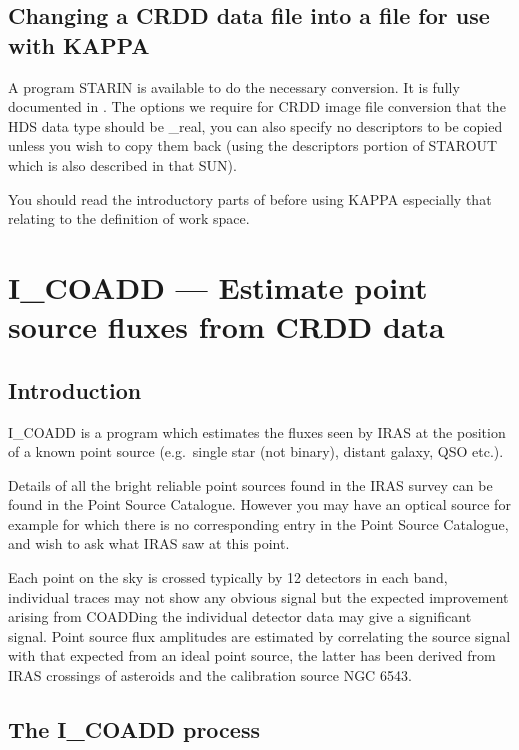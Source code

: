 \documentclass[nolof,noabs,11pt]{starlink}
\begin{document}
\subsection{Changing a CRDD data file into a file for use with KAPPA}

A program STARIN is available to do the necessary conversion. It is fully
documented in . The options we require for CRDD image file conversion
that the HDS data type should be \_real, you can also specify no descriptors to
be copied unless you wish to copy them back (using the descriptors portion of
STAROUT which is also described in that SUN).

You should read the introductory parts of  before using KAPPA especially
that relating to the definition of work space.

\pagebreak

\section{I\_COADD --- Estimate point source fluxes from CRDD data}

\subsection{Introduction}

I\_COADD is a program which estimates the fluxes seen by IRAS at the position
of a known point source (e.g.\ single star (not binary), distant galaxy, QSO
etc.).

Details of all the bright reliable point sources found in the IRAS survey can
be found in the Point Source Catalogue. However you may have an optical source
for example for which there is no corresponding entry in the Point Source
Catalogue, and wish to ask what IRAS saw at this point.


Each point on the sky is crossed typically by 12 detectors in each band,
individual traces may not show any obvious signal but the expected improvement
arising from COADDing the individual detector data may give a significant
signal. Point source flux amplitudes are estimated by correlating the source
signal with that expected from an ideal point source, the latter has been
derived from IRAS crossings of asteroids and the calibration source NGC 6543.

\subsection{The I\_COADD process}
\end{document}
